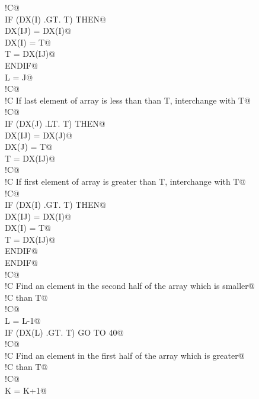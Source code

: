 \documentclass[10pt,a4paper,notitlepage]{article}
\begin{document}
\begin{flushleft}
\begin{list}{}{}
\mbox{}\verb@!C@\\
\mbox{}\verb@      IF (DX(I) .GT. T) THEN@\\
\mbox{}\verb@         DX(IJ) = DX(I)@\\
\mbox{}\verb@         DX(I) = T@\\
\mbox{}\verb@         T = DX(IJ)@\\
\mbox{}\verb@      ENDIF@\\
\mbox{}\verb@      L = J@\\
\mbox{}\verb@!C@\\
\mbox{}\verb@!C     If last element of array is less than than T, interchange with T@\\
\mbox{}\verb@!C@\\
\mbox{}\verb@      IF (DX(J) .LT. T) THEN@\\
\mbox{}\verb@         DX(IJ) = DX(J)@\\
\mbox{}\verb@         DX(J) = T@\\
\mbox{}\verb@         T = DX(IJ)@\\
\mbox{}\verb@!C@\\
\mbox{}\verb@!C        If first element of array is greater than T, interchange with T@\\
\mbox{}\verb@!C@\\
\mbox{}\verb@         IF (DX(I) .GT. T) THEN@\\
\mbox{}\verb@            DX(IJ) = DX(I)@\\
\mbox{}\verb@            DX(I) = T@\\
\mbox{}\verb@            T = DX(IJ)@\\
\mbox{}\verb@         ENDIF@\\
\mbox{}\verb@      ENDIF@\\
\mbox{}\verb@!C@\\
\mbox{}\verb@!C     Find an element in the second half of the array which is smaller@\\
\mbox{}\verb@!C     than T@\\
\mbox{}\verb@!C@\\
\mbox{} L = L-1@\\
\mbox{}\verb@      IF (DX(L) .GT. T) GO TO 40@\\
\mbox{}\verb@!C@\\
\mbox{}\verb@!C     Find an element in the first half of the array which is greater@\\
\mbox{}\verb@!C     than T@\\
\mbox{}\verb@!C@\\
\mbox{} K = K+1@\\

\end{list}
\end{flushleft}
\end{document}

